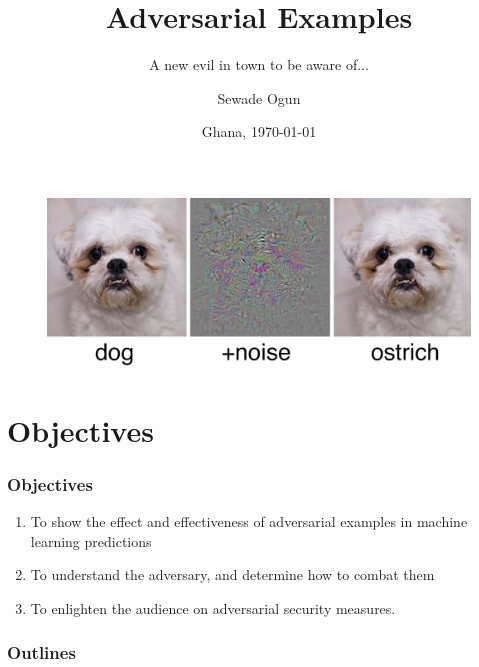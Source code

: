 \documentclass[14pt]{beamer}
\begin{document}
	\addtocounter{framenumber}{-1}
	
	\author{Sewade Ogun}
	\title{Adversarial Examples}
	\subtitle{A new evil in town to be aware of...}
	\date{Ghana, \today}
	\begin{frame}[plain]
	\maketitle
	\begin{figure}
		\centering
		\includegraphics[width=0.7\linewidth]{img/dog}
		\label{fig:dog}
	\end{figure}
\end{frame}

\section{Objectives}
\begin{frame}
\frametitle{Objectives}
\begin{enumerate}
	\item To show the effect and effectiveness of adversarial examples in machine learning predictions
	\item To understand the adversary, and determine how to combat them
	\item To enlighten the audience on adversarial security measures.
\end{enumerate}

\end{frame}

\begin{frame}
	\frametitle{Outlines}
	\tableofcontents
\end{frame}
\end{document}
